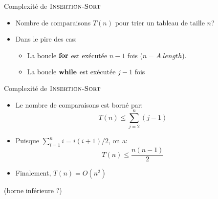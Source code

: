 \begin{frame}{Complexité de $\textnormal{\scshape Insertion-Sort}$}
\begin{center}
\end{center}

\bigskip

\begin{itemize}
\item Nombre de comparaisons $T(n)$ pour trier un tableau de taille $n$?
\item Dans le pire des cas:
\begin{itemize}
\item La boucle $\textbf{for}$ est exécutée $n-1$ fois ($n=A.length$).
\item La boucle $\textbf{while}$ est exécutée $j-1$ fois
\end{itemize}
\end{itemize}

\end{frame}

\begin{frame}{Complexité de $\textnormal{\scshape Insertion-Sort}$}

\begin{itemize}
\item Le nombre de comparaisons est borné par:
$$T(n)\leq \sum_{j=2}^n (j-1)$$
\item Puisque $\sum_{i=1}^n i=i(i+1)/2$, on a:
$$T(n)\leq\frac{n(n-1)}{2}$$
\item Finalement, $T(n)=O(n^2)$
\end{itemize}

\bigskip

(borne inférieure ?)

\end{frame}



